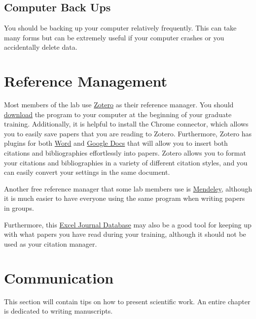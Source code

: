 \documentclass[
]{book}
\begin{document}
\hypertarget{computer-back-ups}{%
\subsection{Computer Back Ups}\label{computer-back-ups}}

You should be backing up your computer relatively frequently. This can take many forms but can be extremely useful if your computer crashes or you accidentally delete data.

\hypertarget{zotero}{%
\section{Reference Management}\label{zotero}}

Most members of the lab use \href{https://www.zotero.org/}{Zotero} as their reference manager. You should \href{https://www.zotero.org/download/}{download} the program to your computer at the beginning of your graduate training. Additionally, it is helpful to install the Chrome connector, which allows you to easily save papers that you are reading to Zotero. Furthermore, Zotero has plugins for both \href{https://www.zotero.org/support/word_processor_plugin_usage}{Word} and \href{https://www.zotero.org/support/google_docs}{Google Docs} that will allow you to insert both citations and bibliographies effortlessly into papers. Zotero allows you to format your citations and bibliographies in a variety of different citation styles, and you can easily convert your settings in the same document.

Another free reference manager that some lab members use is \href{https://www.mendeley.com/download-desktop-new/}{Mendeley}, although it is much easier to have everyone using the same program when writing papers in groups.

Furthermore, this \href{https://www.youtube.com/watch?v=Y40Wy1guAiQ}{Excel Journal Database} may also be a good tool for keeping up with what papers you have read during your training, although it should not be used as your citation manager.

\hypertarget{communication}{%
\section{Communication}\label{communication}}

This section will contain tips on how to present scientific work. An entire chapter is dedicated to writing manuscripts.
\end{document}
